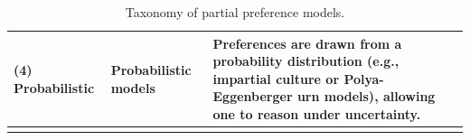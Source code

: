 \documentclass{article}
\begin{document}
\begin{longtable}{p{2.5cm} p{3cm} p{9cm}}
\midrule

\textbf{(4) Probabilistic}
& Probabilistic models & Preferences are drawn from a 
probability distribution (e.g., impartial culture or 
Polya-Eggenberger urn models), allowing one to reason 
under uncertainty. \\
\midrule
\caption{Taxonomy of partial preference models.}
\label{tab:preference-models}
\end{longtable}
\end{document}
